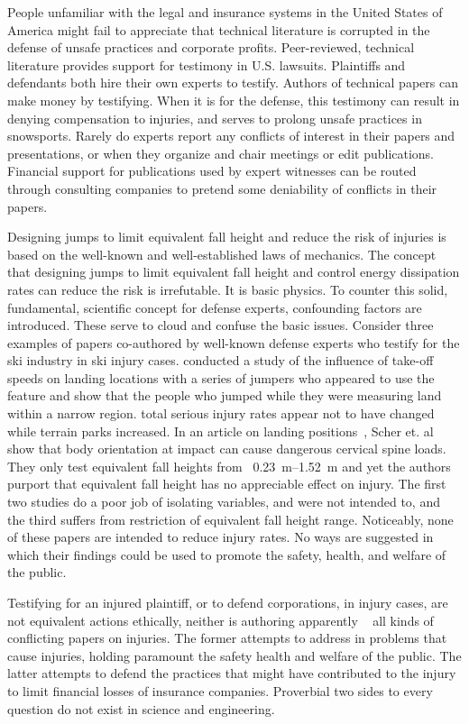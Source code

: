 \documentclass{article}
\begin{document}
People unfamiliar with the legal and insurance systems in the United States of
America might fail to appreciate that technical literature is corrupted in the
defense of unsafe practices and corporate profits. Peer-reviewed, technical
literature provides support for testimony in U.S. lawsuits. Plaintiffs and
defendants both hire their own experts to testify. Authors of technical papers
can make money by testifying. When it is for the defense, this testimony can
result in denying compensation to injuries, and serves to prolong unsafe
practices in snowsports. Rarely do experts report any conflicts of interest in
their papers and presentations, or when they organize and chair meetings or
edit publications. Financial support for publications used by expert witnesses
can be routed through consulting companies to pretend some deniability of
conflicts in their papers.

Designing jumps to limit equivalent fall height and reduce the risk of injuries
is based on the well-known and well-established laws of mechanics. The concept
that designing jumps to limit equivalent fall height and control energy
dissipation rates can reduce the risk is irrefutable. It is basic physics. To
counter this solid, fundamental, scientific concept for defense experts,
confounding factors are introduced. These serve to cloud and confuse the basic
issues. Consider three examples of papers co-authored by well-known defense
experts who testify for the ski industry in ski injury cases. \cite{Shealy2010}
conducted a study of the influence of take-off speeds on landing locations with
a series of jumpers who appeared to use the feature and show that the people
who jumped while they were measuring land within a narrow region.
\cite{Shealy2015} total serious injury rates appear not to have changed while
terrain parks increased. In an article on landing
positions~\cite{Scher2015}, Scher et. al show that body orientation at impact
can cause dangerous cervical spine loads. They only test equivalent fall
heights from ~\SIrange{0.23}{1.52}{\meter} and yet the authors purport that
equivalent fall height has no appreciable effect on injury. The first two
studies do a poor job of isolating variables, and were not intended to, and the
third suffers from restriction of equivalent fall height range. Noticeably,
none of these papers are intended to reduce injury rates. No ways are suggested
in which their findings could be used to promote the safety, health, and
welfare of the public.

Testifying for an injured plaintiff, or to defend corporations, in injury
cases, are not equivalent actions ethically, neither is authoring apparently ~
all kinds of conflicting papers on injuries. The former attempts to address in
problems that cause injuries, holding paramount the safety health and welfare
of the public. The latter attempts to defend the practices that might have
contributed to the injury to limit financial losses of insurance companies.
Proverbial two sides to every question do not exist in science and engineering.
\end{document}
